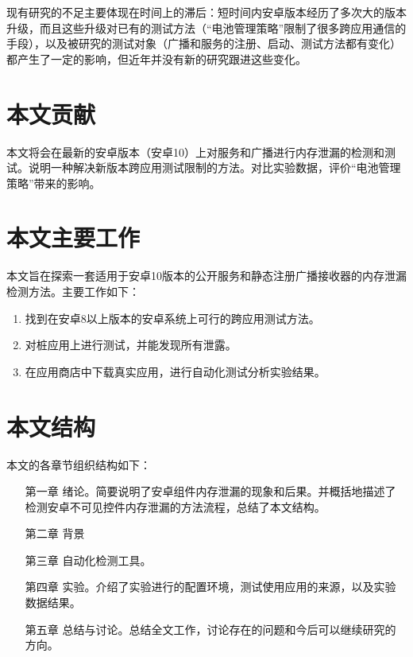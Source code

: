 现有研究的不足主要体现在时间上的滞后：短时间内安卓版本经历了多次大的版本升级，而且这些升级对已有的测试方法（“电池管理策略”限制了很多跨应用通信的手段），以及被研究的测试对象（广播和服务的注册、启动、测试方法都有变化）都产生了一定的影响，但近年并没有新的研究跟进这些变化。

\section{本文贡献}

本文将会在最新的安卓版本（安卓10）上对服务和广播进行内存泄漏的检测和测试。说明一种解决新版本跨应用测试限制的方法。对比实验数据，评价“电池管理策略”带来的影响。

\section{本文主要工作}
本文旨在探索一套适用于安卓10版本的公开服务和静态注册广播接收器的内存泄漏检测方法。主要工作如下：
\newline
\begin{enumerate}
\item 找到在安卓8以上版本的安卓系统上可行的跨应用测试方法。

\item 对桩应用上进行测试，并能发现所有泄露。

\item 在应用商店中下载真实应用，进行自动化测试分析实验结果。

\end{enumerate}
\section{本文结构}
本文的各章节组织结构如下：
\begin{itemize}
	\item[第一章] 绪论。简要说明了安卓组件内存泄漏的现象和后果。并概括地描述了检测安卓不可见控件内存泄漏的方法流程，总结了本文结构。
	\item[第二章] 背景
	\item[第三章] 自动化检测工具。
	\item[第四章] 实验。介绍了实验进行的配置环境，测试使用应用的来源，以及实验数据结果。
	\item[第五章] 总结与讨论。总结全文工作，讨论存在的问题和今后可以继续研究的方向。
\end{itemize}